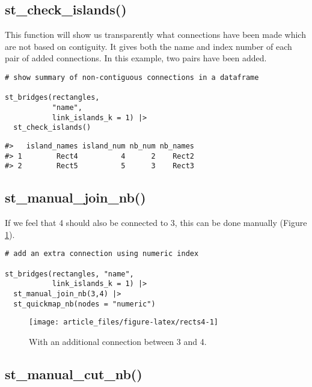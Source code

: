 \hypertarget{st_check_islands}{%
\subsection{st\_check\_islands()}\label{st_check_islands}}

This function will show us transparently what connections have been made which
are not based on contiguity. It gives both the name and index number of each pair of added connections. In this example, two pairs have been added.

\begin{verbatim}
# show summary of non-contiguous connections in a dataframe

st_bridges(rectangles, 
           "name", 
           link_islands_k = 1) |> 
  st_check_islands()
\end{verbatim}

\begin{verbatim}
#>   island_names island_num nb_num nb_names
#> 1        Rect4          4      2    Rect2
#> 2        Rect5          5      3    Rect3
\end{verbatim}

\hypertarget{st_manual_join_nb}{%
\subsection{st\_manual\_join\_nb()}\label{st_manual_join_nb}}

If we feel that 4 should also be connected to 3, this can be done
manually (Figure \ref{fig:rects4}).

\begin{verbatim}
# add an extra connection using numeric index

st_bridges(rectangles, "name", 
           link_islands_k = 1) |> 
  st_manual_join_nb(3,4) |> 
  st_quickmap_nb(nodes = "numeric")
\end{verbatim}

\begin{figure}

{\centering \texttt{[image: article\_files/figure-latex/rects4-1]} 

}

\caption{With an additional connection between 3 and 4. }\label{fig:rects4}
\end{figure}

\hypertarget{st_manual_cut_nb}{%
\subsection{st\_manual\_cut\_nb()}\label{st_manual_cut_nb}}

